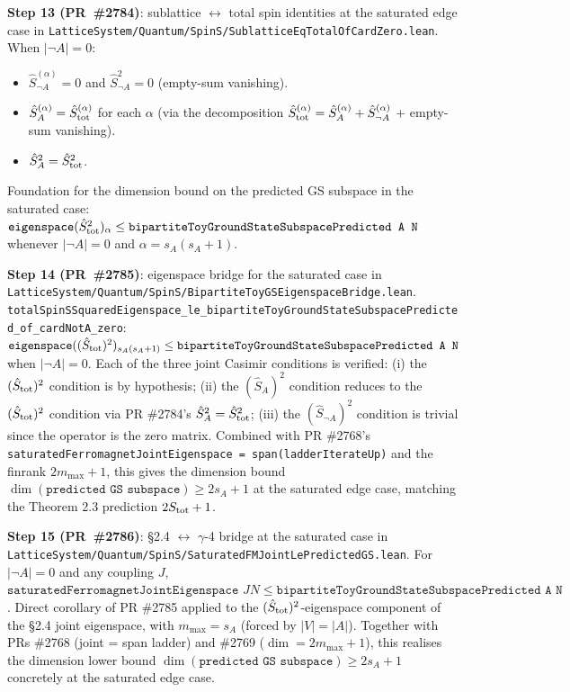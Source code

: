 \documentclass[a4paper,11pt]{article}
\begin{document}
\textbf{Step 13 (PR~\#2784)}: sublattice $\leftrightarrow$ total
spin identities at the saturated edge case in
\texttt{LatticeSystem/Quantum/SpinS/SublatticeEqTotalOfCardZero.lean}.
When $|\neg A| = 0$:
\begin{itemize}
\item $\hat S_{\neg A}^{(\alpha)} = 0$ and $\hat S_{\neg A}^2 = 0$
(empty-sum vanishing).
\item $\hat S_A^{(\alpha)} = \hat S_{\rm tot}^{(\alpha)}$ for each
$\alpha$ (via the decomposition
$\hat S_{\rm tot}^{(\alpha)} = \hat S_A^{(\alpha)} +
\hat S_{\neg A}^{(\alpha)}$ + empty-sum vanishing).
\item $\hat S_A^2 = \hat S_{\rm tot}^2$.
\end{itemize}
Foundation for the dimension bound on the predicted GS subspace
in the saturated case:
$\texttt{eigenspace}(\hat S_{\rm tot}^2)_\alpha \le
\texttt{bipartiteToyGroundStateSubspacePredicted A N}$ whenever
$|\neg A| = 0$ and $\alpha = s_A(s_A+1)$.

\textbf{Step 14 (PR~\#2785)}: eigenspace bridge for the
saturated case in
\texttt{LatticeSystem/Quantum/SpinS/BipartiteToyGSEigenspaceBridge.lean}.
\texttt{totalSpinSSquaredEigenspace\_le\_bipartiteToyGroundStateSubspacePredicted\_of\_cardNotA\_zero}:
$\texttt{eigenspace}((\hat S_{\rm tot})^2)_{s_A(s_A+1)} \le
\texttt{bipartiteToyGroundStateSubspacePredicted A N}$ when
$|\neg A| = 0$. Each of the three joint Casimir conditions is
verified: (i) the $(\hat S_{\rm tot})^2$ condition is by
hypothesis; (ii) the $(\hat S_A)^2$ condition reduces to the
$(\hat S_{\rm tot})^2$ condition via PR \#2784's
$\hat S_A^2 = \hat S_{\rm tot}^2$; (iii) the $(\hat S_{\neg A})^2$
condition is trivial since the operator is the zero matrix.
Combined with PR \#2768's
\texttt{saturatedFerromagnetJointEigenspace = span(ladderIterateUp)}
and the finrank $2 m_{\max}+1$, this gives the dimension bound
$\dim(\texttt{predicted GS subspace}) \ge 2 s_A + 1$ at the
saturated edge case, matching the Theorem 2.3 prediction
$2 S_{\rm tot} + 1$.

\textbf{Step 15 (PR~\#2786)}: §2.4 $\leftrightarrow$ $\gamma$-4 bridge
at the saturated case in
\texttt{LatticeSystem/Quantum/SpinS/SaturatedFMJointLePredictedGS.lean}.
For $|\neg A| = 0$ and any coupling $J$,
$\texttt{saturatedFerromagnetJointEigenspace } J N \le
\texttt{bipartiteToyGroundStateSubspacePredicted A N}$.
Direct corollary of PR \#2785 applied to the
$(\hat S_{\rm tot})^2$-eigenspace component of the §2.4 joint
eigenspace, with $m_{\max} = s_A$ (forced by $|V| = |A|$).
Together with PRs \#2768 (joint = span ladder) and \#2769
($\dim = 2 m_{\max}+1$), this realises the dimension lower bound
$\dim(\texttt{predicted GS subspace}) \ge 2 s_A + 1$ concretely
at the saturated edge case.
\end{document}
